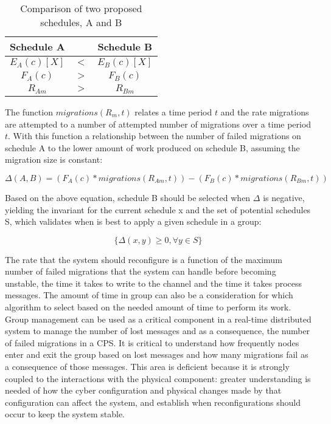 \begin{table}
\caption{Comparison of two proposed schedules, A and B}
\label{tab:SCHED-COMPARE}
\centering
\begin{tabular}{ c  c  c }
Schedule A & & Schedule B \\ \hline
$E_{A}(c)[X]$ & $<$ & $E_{B}(c)[X]$ \\
$F_{A}(c)$ & $>$ & $F_{B}(c)$ \\ 
$R_{Am}$ & $>$ & $R_{Bm}$ \\ 
\end{tabular}
\end{table}

The function $migrations(R_{m},t)$ relates a time period $t$ and the rate migrations are attempted to a number of attempted number of migrations over a time period $t$.
With this function a relationship between the number of failed migrations on schedule A to the lower amount of work produced on schedule B, assuming the migration size is constant:

\begin{equation}
\Delta(A,B) = (F_{A}(c) * migrations(R_{Am},t)) - (F_{B}(c) * migrations(R_{Bm},t))
\end{equation}

Based on the above equation, schedule B should be selected when $\Delta$ is negative, yielding the invariant for the current schedule x and the set of potential schedules S, which validates when is best to apply
a given schedule in a group:

\begin{equation}
\{ \Delta(x,y) \geq 0, \forall y \in S \}
\end{equation}

The rate that the system should reconfigure is a function of the maximum number of failed migrations that the system can handle before becoming unstable, the time it takes to write to the channel and the time it takes process messages.
The amount of time in group can also be a consideration for which algorithm to select based on the needed amount of time to perform its work.
Group management can be used as a critical component in a real-time distributed system to manage the number of lost messages and as a consequence, the number of failed migrations in a CPS.
It is critical to understand how frequently nodes enter and exit the group based on lost messages and how many migrations fail as a consequence of those messages.
This area is deficient because it is strongly coupled to the interactions with the physical component: greater understanding is needed of how the cyber configuration and physical changes made by that configuration can affect the system, and establish when reconfigurations should occur to keep the system stable.

